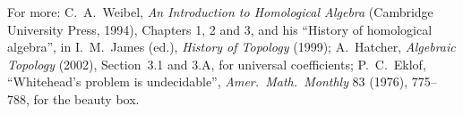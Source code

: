 For more: C.~A.~Weibel, \emph{An Introduction to Homological Algebra} (Cambridge University Press, 1994), Chapters 1, 2 and 3, and his ``History of homological algebra'', in I.~M.~James (ed.), \emph{History of Topology} (1999); A.~Hatcher, \emph{Algebraic
Topology} (2002), Section~3.1 and 3.A, for universal coefficients; P.~C.~Eklof, ``Whitehead's problem is undecidable'', \emph{Amer.\ Math.\ Monthly} 83 (1976), 775--788, for the beauty box.
